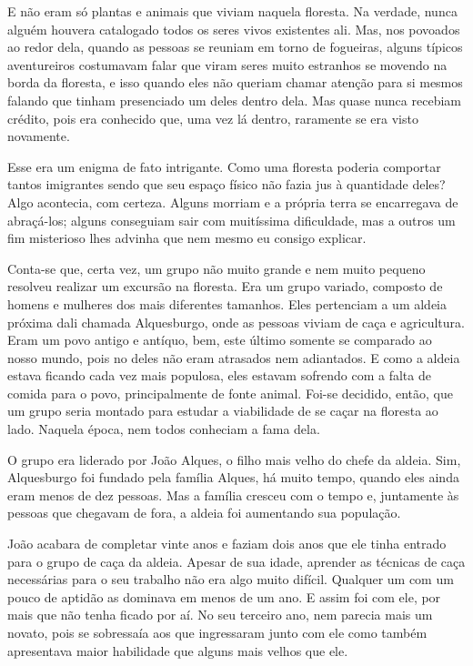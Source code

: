 E não eram só plantas e animais que viviam naquela floresta. Na verdade, nunca alguém houvera catalogado todos os seres vivos existentes ali. Mas, nos povoados ao redor dela, quando as pessoas se reuniam em torno de fogueiras, alguns típicos aventureiros costumavam falar que viram seres muito estranhos se movendo na borda da floresta, e isso quando eles não queriam chamar atenção para si mesmos falando que tinham presenciado um deles dentro dela. Mas quase nunca recebiam crédito, pois era conhecido que, uma vez lá dentro, raramente se era visto novamente.

Esse era um enigma de fato intrigante. Como uma floresta poderia comportar tantos imigrantes sendo que seu espaço físico não fazia jus à quantidade deles? Algo acontecia, com certeza. Alguns morriam e a própria terra se encarregava de abraçá-los; alguns conseguiam sair com muitíssima dificuldade, mas a outros um fim misterioso lhes advinha que nem mesmo eu consigo explicar.

Conta-se que, certa vez, um grupo não muito grande e nem muito pequeno resolveu realizar um excursão na floresta. Era um grupo variado, composto de homens e mulheres dos mais diferentes tamanhos. Eles pertenciam a um aldeia próxima dali chamada Alquesburgo, onde as pessoas viviam de caça e agricultura. Eram um povo antigo e antíquo, bem, este último somente se comparado ao nosso mundo, pois no deles não eram atrasados nem adiantados. E como a aldeia estava ficando cada vez mais populosa, eles estavam sofrendo com a falta de comida para o povo, principalmente de fonte animal. Foi-se decidido, então, que um grupo seria montado para estudar a viabilidade de se caçar na floresta ao lado. Naquela época, nem todos conheciam a fama dela.

O grupo era liderado por João Alques, o filho mais velho do chefe da aldeia. Sim, Alquesburgo foi fundado pela família Alques, há muito tempo, quando eles ainda eram menos de dez pessoas. Mas a família cresceu com o tempo e, juntamente às pessoas que chegavam de fora, a aldeia foi aumentando sua população.

João acabara de completar vinte anos e faziam dois anos que ele tinha entrado para o grupo de caça da aldeia. Apesar de sua idade, aprender as técnicas de caça necessárias para o seu trabalho não era algo muito difícil. Qualquer um com um pouco de aptidão as dominava em menos de um ano. E assim foi com ele, por mais que não tenha ficado por aí. No seu terceiro ano, nem parecia mais um novato, pois se sobressaía aos que ingressaram junto com ele como também apresentava maior habilidade que alguns mais velhos que ele.

